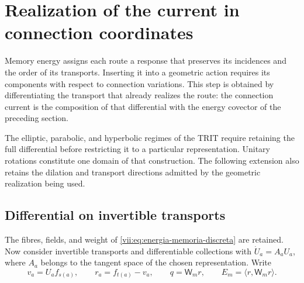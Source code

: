 
\section{Realization of the current in connection coordinates}
\label{vii:sec:composicion-corriente-conexion}

Memory energy assigns each route a response that preserves its
incidences and the order of its transports. Inserting it into a geometric
action requires its components with respect to connection variations.
This step is obtained by differentiating the transport that already
realizes the route: the connection current is the composition of that
differential with the energy covector of the preceding section.

The elliptic, parabolic, and hyperbolic regimes of the TRIT require
retaining the full differential before restricting it to a particular
representation. Unitary rotations constitute one domain of that
construction. The following extension also retains the dilation and
transport directions admitted by the geometric realization being used.

\subsection{Differential on invertible transports}

The fibres, fields, and weight of
\eqref{vii:eq:energia-memoria-discreta} are retained. Now consider
invertible transports and differentiable collections with
\(\dot U_a=A_aU_a\), where \(A_a\) belongs to the tangent space
of the chosen representation. Write
\[
 v_a=U_af_{s(a)},\qquad r_a=f_{t(a)}-v_a,\qquad
 q=\mathsf W_mr,\qquad E_m=\langle r,\mathsf W_mr\rangle.
\]

